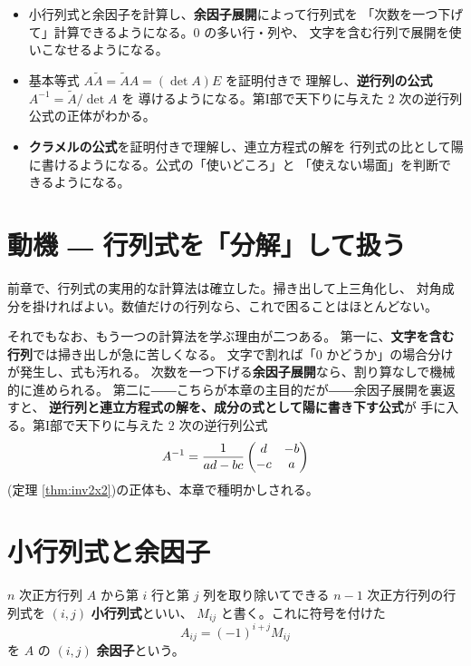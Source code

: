 \begin{goal}
\begin{itemize}
\item 小行列式と余因子を計算し、\textbf{余因子展開}によって行列式を
「次数を一つ下げて」計算できるようになる。$0$ の多い行・列や、
文字を含む行列で展開を使いこなせるようになる。
\item 基本等式 $A\widetilde{A} = \widetilde{A}A = (\det A)E$ を証明付きで
理解し、\textbf{逆行列の公式} $A^{-1} = \widetilde{A}/\det A$ を
導けるようになる。第I部で天下りに与えた $2$ 次の逆行列公式の正体がわかる。
\item \textbf{クラメルの公式}を証明付きで理解し、連立方程式の解を
行列式の比として陽に書けるようになる。公式の「使いどころ」と
「使えない場面」を判断できるようになる。
\end{itemize}
\end{goal}

\section{動機 ― 行列式を「分解」して扱う}

前章で、行列式の実用的な計算法は確立した。掃き出して上三角化し、
対角成分を掛ければよい。数値だけの行列なら、これで困ることはほとんどない。

それでもなお、もう一つの計算法を学ぶ理由が二つある。
第一に、\textbf{文字を含む行列}では掃き出しが急に苦しくなる。
文字で割れば「$0$ かどうか」の場合分けが発生し、式も汚れる。
次数を一つ下げる\textbf{余因子展開}なら、割り算なしで機械的に進められる。
第二に――こちらが本章の主目的だが――余因子展開を裏返すと、
\textbf{逆行列と連立方程式の解を、成分の式として陽に書き下す公式}が
手に入る。第I部で天下りに与えた $2$ 次の逆行列公式
\[
A^{-1} = \frac{1}{ad - bc}\begin{pmatrix}d & -b \\ -c & a\end{pmatrix}
\]
(定理 \ref{thm:inv2x2})の正体も、本章で種明かしされる。

\section{小行列式と余因子}

\begin{teigi}\label{def:cofactor}
$n$ 次正方行列 $A$ から第 $i$ 行と第 $j$ 列を取り除いてできる
$n - 1$ 次正方行列の行列式を $(i, j)$ \textbf{小行列式}といい、
$M_{ij}$ と書く。これに符号を付けた
\[
A_{ij} = (-1)^{i+j} M_{ij}
\]
を $A$ の $(i,j)$ \textbf{余因子}という。
\end{teigi}


